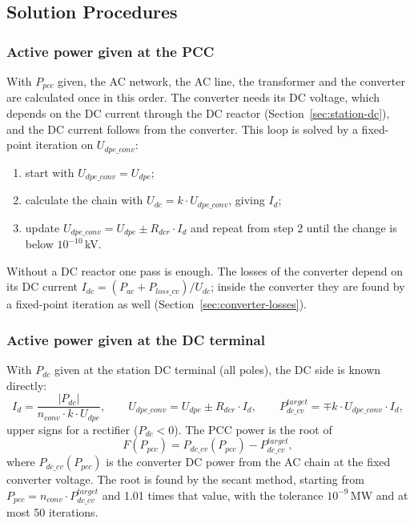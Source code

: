\subsection{Solution Procedures}
\label{sec:station-procedures}

\subsubsection{Active power given at the PCC}

With $P_{pcc}$ given, the AC network, the AC line, the transformer and the converter are calculated once in this
order. The converter needs its DC voltage, which depends on the DC current through the DC reactor
(Section~\ref{sec:station-dc}), and the DC current follows from the converter. This loop is solved by a fixed-point
iteration on $U_{dpe\_conv}$:
\begin{enumerate}
  \item start with $U_{dpe\_conv} = U_{dpe}$;
  \item calculate the chain with $U_{dc} = k \cdot U_{dpe\_conv}$, giving $I_d$;
  \item update $U_{dpe\_conv} = U_{dpe} \pm R_{dcr} \cdot I_d$ and repeat from step 2 until the change is below
        $10^{-10}$\,kV.
\end{enumerate}
Without a DC reactor one pass is enough. The losses of the converter depend on its DC current
$I_{dc} = (P_{ac} + P_{loss\_cv}) / U_{dc}$; inside the converter they are found by a fixed-point iteration as
well (Section~\ref{sec:converter-losses}).

\subsubsection{Active power given at the DC terminal}

With $P_{dc}$ given at the station DC terminal (all poles), the DC side is known directly:
\begin{equation}
  I_d = \frac{|P_{dc}|}{n_{conv} \cdot k \cdot U_{dpe}} , \qquad
  U_{dpe\_conv} = U_{dpe} \pm R_{dcr} \cdot I_d , \qquad
  P_{dc\_cv}^{target} = \mp k \cdot U_{dpe\_conv} \cdot I_d ,
\end{equation}
upper signs for a rectifier ($P_{dc} < 0$). The PCC power is the root of
\begin{equation}
  F(P_{pcc}) = P_{dc\_cv}(P_{pcc}) - P_{dc\_cv}^{target} ,
\end{equation}
where $P_{dc\_cv}(P_{pcc})$ is the converter DC power from the AC chain at the fixed converter voltage. The root is
found by the secant method, starting from $P_{pcc} = n_{conv} \cdot P_{dc\_cv}^{target}$ and 1.01 times that value,
with the tolerance $10^{-9}$\,MW and at most 50 iterations.

